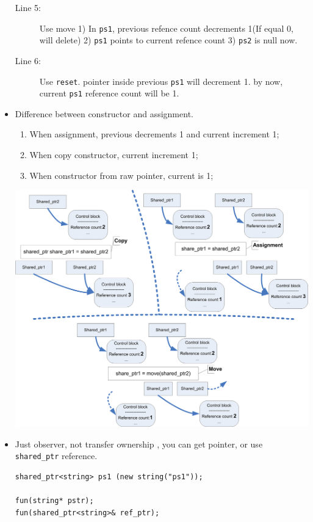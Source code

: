 \documentclass[a4paper,11pt,twoside]{book}
\begin{document}
\begin{itemize}
\begin{description}
	\item[Line 5:] Use move 1) In \texttt{ps1}, previous refence count decrements 1(If equal 0, will delete) 2) \texttt{ps1} points to current refence count 3) \texttt{ps2} is null now. 
	
	\item[Line 6:] Use \texttt{reset}. pointer inside previous \texttt{ps1} will decrement 1. by now, current \texttt{ps1} reference count will be 1.
\end{description}

\item Difference between constructor and assignment.
\begin{enumerate}
	\item When assignment, previous decrements 1 and current increment 1;
	\item When copy constructor, current increment 1;
	\item When constructor from raw pointer, current is 1;
\end{enumerate}

\begin{center}
	\includegraphics[width=0.9\linewidth]{pics/shared_ptr.png}
\end{center}


\item Just observer, not transfer ownership , you can get pointer, or use \texttt{shared\_ptr} reference. 
\begin{lstlisting}[numbers = none]
shared_ptr<string> ps1 (new string("ps1"));

fun(string* pstr);
fun(shared_ptr<string>& ref_ptr);
\end{lstlisting}




\end{itemize}
\end{document}
